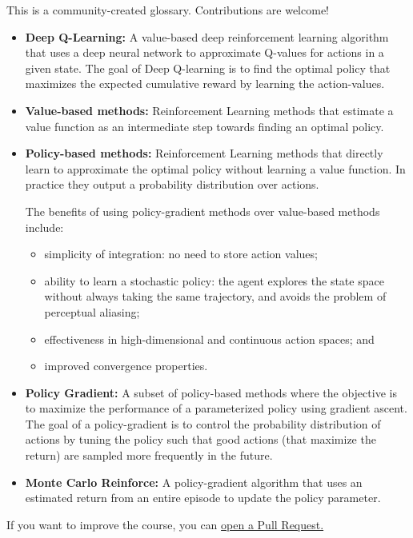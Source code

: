 \documentclass[11pt,a4paper]{article}
\begin{document}
This is a community-created glossary. Contributions are welcome!

\begin{itemize}
\item
  \textbf{Deep Q-Learning:} A value-based deep reinforcement learning algorithm that uses a deep neural network to approximate Q-values for actions in a given state. The goal of Deep Q-learning is to find the optimal policy that maximizes the expected cumulative reward by learning the action-values.
\item
  \textbf{Value-based methods:} Reinforcement Learning methods that estimate a value function as an intermediate step towards finding an optimal policy.
\item
  \textbf{Policy-based methods:} Reinforcement Learning methods that directly learn to approximate the optimal policy without learning a value function. In practice they output a probability distribution over actions.

  The benefits of using policy-gradient methods over value-based methods include:

  \begin{itemize}
  \tightlist
  \item
    simplicity of integration: no need to store action values;
  \item
    ability to learn a stochastic policy: the agent explores the state space without always taking the same trajectory, and avoids the problem of perceptual aliasing;
  \item
    effectiveness in high-dimensional and continuous action spaces; and
  \item
    improved convergence properties.
  \end{itemize}
\item
  \textbf{Policy Gradient:} A subset of policy-based methods where the objective is to maximize the performance of a parameterized policy using gradient ascent. The goal of a policy-gradient is to control the probability distribution of actions by tuning the policy such that good actions (that maximize the return) are sampled more frequently in the future.
\item
  \textbf{Monte Carlo Reinforce:} A policy-gradient algorithm that uses an estimated return from an entire episode to update the policy parameter.
\end{itemize}

If you want to improve the course, you can \href{https://github.com/huggingface/deep-rl-class/pulls}{open a Pull Request.}
\end{document}
